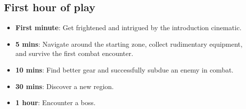 \documentclass[11pt]{article}
\begin{document}
	\subsection{First hour of play}
	
	\begin{itemize}
		\item\textbf{First minute}: Get frightened and intrigued by the introduction cinematic.
		\item\textbf{5 mins}: Navigate around the starting zone, collect rudimentary equipment, and survive the first combat encounter.
		\item\textbf{10 mins}: Find better gear and successfully subdue an enemy in combat.
		\item\textbf{30 mins}: Discover a new region.
		\item\textbf{1 hour}: Encounter a boss.
	\end{itemize}
	
\end{document}
